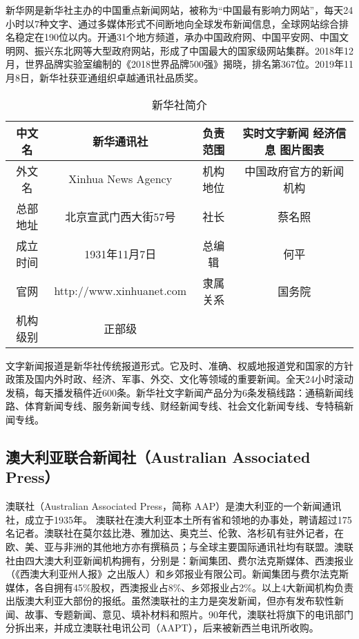 \documentclass[a4paper,openany]{book}
\begin{document}
新华网是新华社主办的中国重点新闻网站，被称为“中国最有影响力网站”，每天24小时以7种文字、通过多媒体形式不间断地向全球发布新闻信息，全球网站综合排名稳定在190位以内。开通31个地方频道，承办中国政府网、中国平安网、中国文明网、振兴东北网等大型政府网站，形成了中国最大的国家级网站集群。2018年12月，世界品牌实验室编制的《2018世界品牌500强》揭晓，排名第367位。2019年11月8日，新华社获亚通组织卓越通讯社品质奖。

\begin{table}[ht]
\centering
\setlength{\belowcaptionskip}{5pt}
\caption{新华社简介}
\begin{tabular}{|c|c|c|c|}
\hline
中文名  & 新华通讯社                    & 负责范围 & 实时文字新闻 经济信息 图片图表 \\ \hline
外文名  & Xinhua News Agency       & 机构地位 & 中国政府官方的新闻机构      \\ \hline
总部地址 & 北京宣武门西大街57号              & 社长   & 蔡名照              \\ \hline
成立时间 & 1931年11月7日               & 总编辑  & 何平               \\ \hline
官网   & http://www.xinhuanet.com & 隶属关系 & 国务院              \\ \hline
机构级别 & 正部级                      &      &                  \\ \hline
\end{tabular}
\end{table}

文字新闻报道是新华社传统报道形式。它及时、准确、权威地报道党和国家的方针政策及国内外时政、经济、军事、外交、文化等领域的重要新闻。全天24小时滚动发稿，每天播发稿件近600条。新华社文字新闻产品分为6条发稿线路：通稿新闻线路、体育新闻专线、服务新闻专线、财经新闻专线、社会文化新闻专线、专特稿新闻专线。


\subsection{澳大利亚联合新闻社（Australian Associated Press）}

澳联社（Australian Associated Press，简称 AAP）是澳大利亚的一个新闻通讯社，成立于1935年。 澳联社在澳大利亚本土所有省和领地的办事处，聘请超过175名记者。澳联社在莫尔兹比港、雅加达、奥克兰、伦敦、洛杉矶有驻外记者，在欧、美、亚与非洲的其他地方亦有撰稿员；与全球主要国际通讯社均有联盟。澳联社由四大澳大利亚新闻机构拥有，分别是：新闻集团、费尔法克斯媒体、西澳报业（《西澳大利亚州人报》之出版人）和乡郊报业有限公司。新闻集团与费尔法克斯媒体，各自拥有45\%股权，西澳报业占8\%、乡郊报业占2\%。以上4大新闻机构负责出版澳大利亚大部份的报纸。虽然澳联社的主力是突发新闻，但亦有发布软性新闻、故事、专题新闻、意见、填补材料和照片。90年代，澳联社将旗下的电讯部门分拆出来，并成立澳联社电讯公司（AAPT），后来被新西兰电讯所收购。
\end{document}
